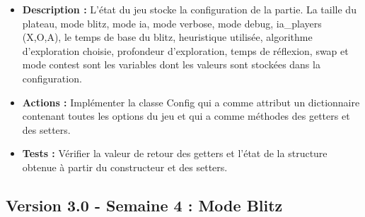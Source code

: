 \documentclass{article}
\begin{document}
\begin{itemize}
\begin{itemize}
        \item \textbf{Description :} L'état du jeu stocke la configuration de la partie. La taille du plateau, mode blitz, mode ia, mode verbose, mode debug, ia\_players (X,O,A), le temps de base du blitz, heuristique utilisée, algorithme d'exploration choisie, profondeur d'exploration, temps de réflexion, swap et mode contest sont les variables dont les valeurs sont stockées dans la configuration. 
        \item \textbf{Actions :} Implémenter la classe Config qui a comme attribut un dictionnaire contenant toutes les options du jeu et qui a comme méthodes des getters et des setters.
        \item \textbf{Tests :} Vérifier la valeur de retour des getters et l’état de la structure obtenue à partir du constructeur et des setters.
    \end{itemize}
\end{itemize}

\subsection{Version 3.0 - Semaine 4 : Mode Blitz}
\end{document}
